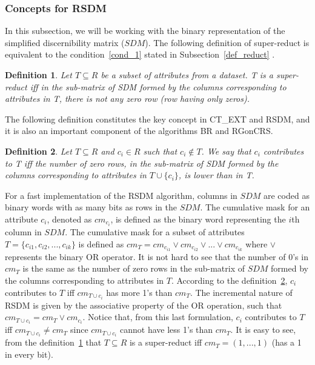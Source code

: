 \documentclass[authoryear,11pt]{elsarticle}
\newtheorem{definition}{Definition}
\begin{document}
\subsubsection{Concepts for RSDM}
	In this subsection, we will be working with the binary representation of the simplified discernibility matrix
	($SDM$). The following definition of super-reduct is equivalent to the condition~\ref{cond_1} stated in 
	Subsection~\ref{def_reduct} \citep{Lazo15}.
	
	\begin{definition}\label{def:testor}
		Let $T \subseteq R$ be a subset of attributes from a dataset. T is a super-reduct iff in the
		sub-matrix of SDM formed by the columns corresponding to attributes in T, there is not any zero row (row 
		having only zeros).
	\end{definition}
	
	The following definition constitutes the key concept in CT\_EXT and RSDM, and it is also an important component 
	of the algorithms BR and RGonCRS.
		
	\begin{definition}\label{def:contrib}
		Let $T \subseteq R$ and  $c_i \in R$ such that $c_i \notin T$. We say that $c_i$ contributes to T iff the
		number of zero rows, in the sub-matrix of SDM formed by the columns corresponding to attributes in 
		$T\cup\{c_i\}$, is lower than in T.
	\end{definition}		
		
	For a fast implementation of the RSDM algorithm, columns in $SDM$ are coded as binary words with as many 
	bits as 	rows in the $SDM$. The cumulative mask for an attribute $c_i$, denoted as $cm_{c_i}$, is defined as 
	the binary word representing the $i$th column in $SDM$. The cumulative mask for a subset of attributes
	$T=\lbrace c_{i1},c_{i2},...,c_{ik} \rbrace$ is defined	as $cm_T = cm_{c_{i1}} \vee cm_{c_{i2}} \vee ... 
	\vee cm_{c_{ik}}$ where $\vee$ represents the binary OR operator. It is not hard to see that the number of 
	0's in $cm_T$ is the same as the number of zero rows in the sub-matrix of $SDM$ formed by the columns
	corresponding to attributes in $T$. 
	According to the definition~\ref{def:contrib}, $c_i$ contributes to $T$ iff $cm_{T\cup c_i}$ has more 1's than 
	$cm_T$. 	The incremental nature of RSDM is given by the associative property of the OR operation, such that 
	$cm_{T\cup c_i}=cm_T\vee cm_{c_i}$. Notice that, from this last formulation, $c_i$ contributes to $T$ iff 
	$cm_{T\cup c_i}\neq cm_T$ since $cm_{T\cup c_i}$ cannot have less 1's than $cm_T$. It is easy to see, from the
	definition~\ref{def:testor} that $T \subseteq R$ is a super-reduct iff $cm_T=(1,...,1)$ (has a 1 in every bit).
	
\end{document}
